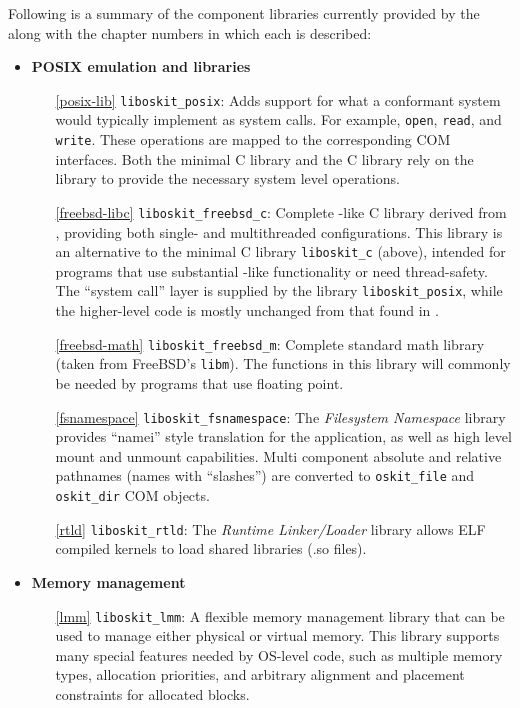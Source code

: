 Following is a summary of
the component libraries currently provided by the \oskit{}
along with the chapter numbers in which each is described:
\begin{itemize}

\item {\bf POSIX emulation and libraries}
\begin{itemize}
\item[\ref{posix-lib}]		{\tt liboskit_posix}:
	Adds support for what a \posix{} conformant system would typically
	implement as system calls. For example, {\tt open}, {\tt read}, and
	{\tt write}. These \posix{} operations are mapped to the
	corresponding \oskit{} COM interfaces. Both the minimal C library
	and the \freebsd{} C library rely on the \posix{} library to
	provide the necessary system level operations.

\item[\ref{freebsd-libc}]	{\tt liboskit_freebsd_c}:
	Complete \posix{}-like C library derived from \freebsd{},
	providing both single- and multithreaded configurations.
	This library is an alternative to the minimal C library
	{\tt liboskit_c} (above), intended for programs that use
	substantial \posix{}-like functionality or need thread-safety.
	The \freebsd{} ``system call'' layer is supplied by the \posix{}
	library {\tt liboskit_posix}, while the higher-level code
	is mostly unchanged from that found in \freebsd{}.

\item[\ref{freebsd-math}]	{\tt liboskit_freebsd_m}:
	Complete standard math library (taken from FreeBSD's {\tt libm}).
	The functions in this library will commonly be needed by programs
	that use floating point.

\item[\ref{fsnamespace}]	{\tt liboskit_fsnamespace}:
	The \emph{Filesystem Namespace} library provides ``namei'' style
	translation for the application, as well as high level mount and
	unmount capabilities. Multi component absolute and relative
	pathnames (names with ``slashes'') are converted to
	\texttt{oskit_file} and \texttt{oskit_dir} COM objects.

\item[\ref{rtld}]		{\tt liboskit_rtld}:
	The \emph{Runtime Linker/Loader} library allows ELF compiled
	\oskit{} kernels to load shared libraries (.so files).
\end{itemize}


\item {\bf Memory management}
\begin{itemize}
\item[\ref{lmm}]	{\tt liboskit_lmm}:
	A flexible memory management library
	that can be used to manage either physical or virtual memory.
	This library supports many special features needed by OS-level code,
	such as multiple memory types, allocation priorities,
	and arbitrary alignment and placement constraints for allocated blocks.


\end{itemize}
\end{itemize}
